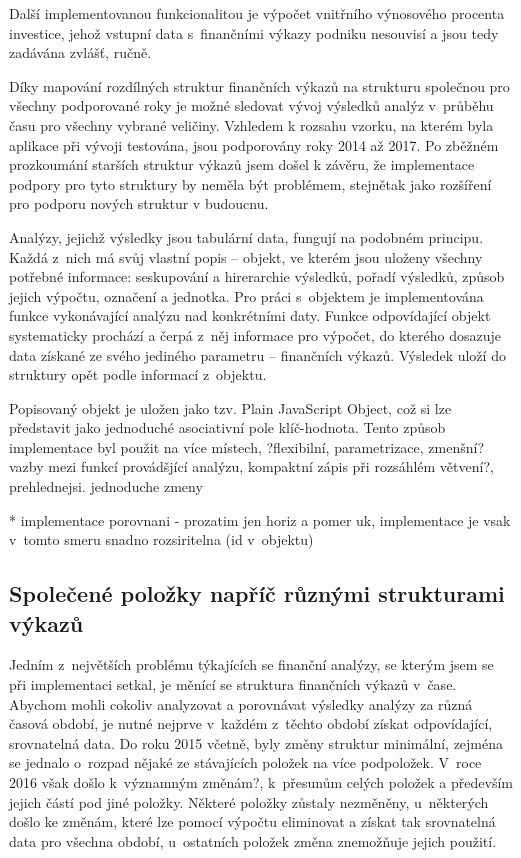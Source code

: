 Další implementovanou funkcionalitou je výpočet vnitřního výnosového procenta investice, jehož vstupní data s~finančními výkazy podniku nesouvisí a jsou tedy zadávána zvlášť, ručně.

Díky mapování rozdílných struktur finančních výkazů na strukturu společnou pro všechny podporované roky je možné sledovat vývoj výsledků analýz v~průběhu času pro všechny vybrané veličiny. Vzhledem k rozsahu vzorku, na kterém byla aplikace při vývoji testována, jsou podporovány roky 2014 až 2017. Po zběžném prozkoumání starších struktur výkazů jsem došel k závěru, že implementace podpory pro tyto struktury by neměla být problémem, stejnětak jako rozšíření pro podporu nových struktur v budoucnu.

Analýzy, jejichž výsledky jsou tabulární data, fungují na podobném principu. Každá z~nich má svůj vlastní popis -- objekt, ve kterém jsou uloženy všechny potřebné informace: seskupování a hirerarchie výsledků, pořadí výsledků, způsob jejich výpočtu, označení a jednotka. Pro práci s~objektem je implementována funkce vykonávající analýzu nad konkrétními daty. Funkce odpovídající objekt systematicky prochází a čerpá z~něj informace pro výpočet, do kterého dosazuje data získané ze svého jediného parametru -- finančních výkazů. Výsledek uloží do struktury opět podle informací z~objektu.

Popisovaný objekt je uložen jako tzv. Plain JavaScript Object, což si lze představit jako jednoduché asociativní pole klíč-hodnota. Tento způsob implementace byl použit na více místech, ?flexibilní, parametrizace, zmenšní? vazby mezi funkcí provádšjící analýzu, kompaktní zápis při rozsáhlém větvení?, prehlednejsi. jednoduche zmeny

* implementace porovnani - prozatim jen horiz a pomer uk, implementace je vsak v~tomto smeru snadno rozsiritelna (id v~objektu)

\subsection{Společené položky napříč různými strukturami výkazů}
Jedním z~největších problému týkajících se finanční analýzy, se kterým jsem se při implementaci setkal, je měnící se struktura finančních výkazů v~čase. Abychom mohli cokoliv analyzovat a porovnávat výsledky analýzy za různá časová období, je nutné nejprve v~každém z~těchto období získat odpovídající, srovnatelná data. Do roku 2015 včetně, byly změny struktur minimální, zejména se jednalo o~rozpad nějaké ze stávajících položek na více podpoložek. V~roce 2016 však došlo k~významným změnám?, k~přesunům celých položek a především jejich částí pod jiné položky. Některé položky zůstaly nezměněny, u~některých došlo ke změnám, které lze pomocí výpočtu eliminovat a získat tak srovnatelná data pro všechna období, u~ostatních položek změna znemožňuje jejich použití. 

